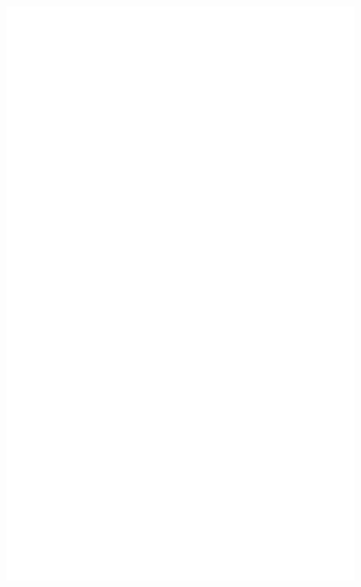 \documentclass[12pt]{article}
\begin{document}
\newpage

\pagecolor{blueColor}

\begin{titlepage}
    \centering

     \includegraphics[width=0.88\textwidth, keepaspectratio]{arka-cover.png}
    
\end{titlepage}

\newpage

\pagecolor{white}




\renewenvironment{abstract}
 {\small
  \begin{center}
  \bfseries \abstractname\vspace{-.5em}\vspace{0pt}
  \end{center}
  \list{}{
    \setlength{\leftmargin}{.5cm}%
    \setlength{\rightmargin}{\leftmargin}%
  }%
  \item\relax}
 {\endlist}
 
\end{document}
